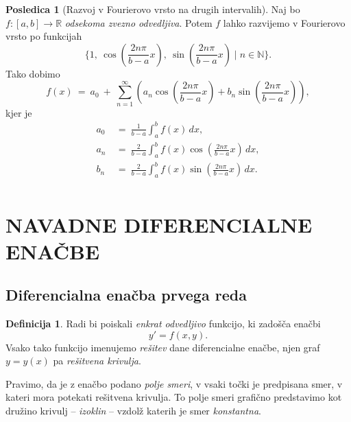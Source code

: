\documentclass[11pt]{article}
\theoremstyle{definition}
\newtheorem{definicija}{Definicija}[section]
\theoremstyle{definition}
\theoremstyle{definition}
\theoremstyle{theorem}
\newtheorem*{posledica}{Posledica}
\begin{document}
\begin{posledica}[Razvoj v Fourierovo vrsto na drugih intervalih]

Naj bo \hbox{$f:[a, b] \rightarrow \mathbb{R}$} \textit{odsekoma zvezno odvedljiva}. Potem $f$ lahko razvijemo v Fourierovo vrsto po funkcijah
$$\{ 1, ~\cos \left( \frac{2n\pi}{b-a}x \right), ~\sin \left( \frac{2n\pi}{b-a}x \right) \mid n \in \mathbb{N} \}.$$
Tako dobimo
$$f(x) ~=~ a_0 ~+~ \sum_{n=1}^{\infty} \left( a_n \cos \left( \frac{2n\pi}{b-a}x \right) + b_n \sin \left( \frac{2n\pi}{b-a}x \right) \right),$$
kjer je 
\begin{align*}
a_0 ~&=~ \frac{1}{b-a} \int_{a}^{b} f(x)\,dx, \\
a_n ~&=~ \frac{2}{b-a} \int_{a}^{b} f(x) \cos \left( \frac{2n\pi}{b-a}x \right)\,dx, \\
b_n ~&=~ \frac{2}{b-a} \int_{a}^{b} f(x) \sin \left( \frac{2n\pi}{b-a}x \right)\,dx. \\
\end{align*}

\end{posledica}
\vspace{0.5cm}


\pagebreak


\section{NAVADNE DIFERENCIALNE ENAČBE}
\vspace{0.5cm}


\subsection{Diferencialna enačba prvega reda}
\vspace{0.5cm}

\begin{definicija}

Radi bi poiskali \textit{enkrat odvedljivo} funkcijo, ki zadošča enačbi
$$y' = f(x, y).$$
Vsako tako funkcijo imenujemo \textit{rešitev} dane diferencialne enačbe, njen graf $y = y(x)$ pa \textit{rešitvena krivulja}.

Pravimo, da je z enačbo podano \textit{polje smeri}, v vsaki točki je predpisana smer, v kateri mora potekati rešitvena krivulja. To polje smeri grafično predstavimo kot družino krivulj \--- \textit{izoklin} \--- vzdolž katerih je smer \textit{konstantna}.

\end{definicija}
\vspace{0.5cm}
\end{document}
